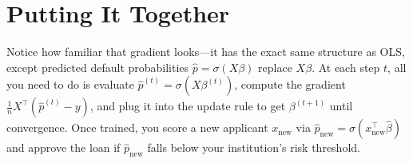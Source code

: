 \documentclass[12pt]{article}
\begin{document}
\section{Putting It Together}

Notice how familiar that gradient looks---it has the exact same structure as
OLS, except predicted default probabilities $\hat{p} = \sigma(X\beta)$ replace
$X\beta$. At each step $t$, all you need to do is evaluate
$\hat{p}^{(t)} = \sigma(X\beta^{(t)})$, compute the gradient
$\frac{1}{n} X^\top (\hat{p}^{(t)} - y)$, and plug it into the update rule to
get $\beta^{(t+1)}$ until convergence. Once trained, you score a new applicant
$x_{\text{new}}$ via $\hat{p}_{\text{new}} = \sigma(x_{\text{new}}^\top \hat{\beta})$
and approve the loan if $\hat{p}_{\text{new}}$ falls below your institution's
risk threshold.

\end{document}
